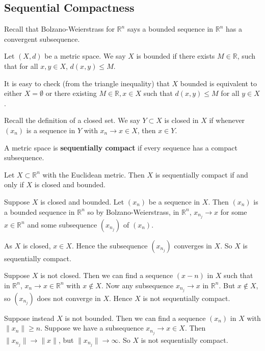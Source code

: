 \documentclass[12pt]{article}
\begin{document}
\subsection{Sequential Compactness}%
\label{sub:sequential_compactness}

Recall that Bolzano-Weierstrass for $\mathbb{R}^{n}$ says a bounded sequence in $\mathbb{R}^{n}$ has a convergent subsequence.

\begin{definition}
	Let $(X, d)$ be a metric space. We say $X$ is bounded if there exists $M \in \mathbb{R}$, such that for all $x, y \in X$, $d(x, y) \leq M$.
\end{definition}

\begin{remark}
	It is easy to check (from the triangle inequality) that $X$ bounded is equivalent to either $X = \emptyset$ or there existing $M \in \mathbb{R}, x \in X$ such that $d(x, y) \leq M$ for all $y \in X$.
\end{remark}

Recall the definition of a closed set. We say $Y \subset X$ is closed in $X$ if whenever $(x_n)$ is a sequence in $Y$ with $x_n \to x \in X$, then $x \in Y$.

\begin{definition}
	A metric space is \textbf{sequentially compact} if every sequence has a compact subsequence.
\end{definition}

\begin{theorem}
	Let $X \subset \mathbb{R}^{n}$ with the Euclidean metric. Then $X$ is sequentially compact if and only if $X$ is closed and bounded.
\end{theorem}

\begin{proofbox}
	Suppose $X$ is closed and bounded. Let $(x_n)$ be a sequence in $X$. Then $(x_n)$ is a bounded sequence in $\mathbb{R}^{n}$ so by Bolzano-Weierstrass, in $\mathbb{R}^{n}$, $x_{n_j} \to x$ for some $x \in \mathbb{R}^{n}$ and some subsequence $(x_{n_j})$ of $(x_n)$. 

	As $X$ is closed, $x \in X$. Hence the subsequence $(x_{n_j})$ converges in $X$. So $X$ is sequentially compact.

	Suppose $X$ is not closed. Then we can find a sequence $(x-n)$ in $X$ such that in $\mathbb{R}^{n}$, $x_n \to x \in \mathbb{R}^{n}$ with $x \not \in X$. Now any subsequence $x_{n_j} \to x$ in $\mathbb{R}^{n}$. But $x \not \in X$, so $(x_{n_j})$ does not converge in $X$. Hence $X$ is not sequentially compact.

	Suppose instead $X$ is not bounded. Then we can find a sequence $(x_n)$ in $X$ with $\|x_n\| \geq n$. Suppose we have a subsequence $x_{n_j}\to x \in X$. Then $\|x_{n_j}\| \to \|x\|$, but $\|x_{n_j}\| \to \infty$. So $X$ is not sequentially compact.
\end{proofbox}
\end{document}
